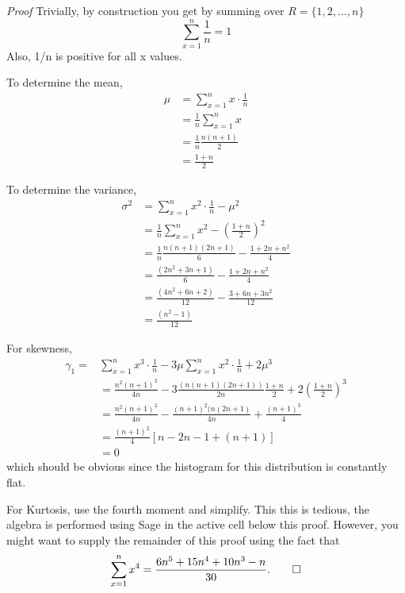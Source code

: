 \documentclass[10pt,]{book}
\makeatletter
\renewcommand*{\proofname}{Proof}
\renewenvironment{proof}[1][\proofname]{\par
  \pushQED{\qed}%
  \normalfont \topsep6\p@\@plus6\p@\relax
  \trivlist
  \item\relax
    {\itshape
    #1\@addpunct{.}}\hspace\labelsep\ignorespaces
}{%
  \popQED\endtrivlist\@endpefalse
}
\numberwithin{equation}{section}
\makeatother
\begin{document}
\begin{proof}\hypertarget{proof-34}{}
\hypertarget{p-795}{}%
Trivially, by construction you get by summing over \(R = \{1, 2, ... , n \}\)%
\begin{equation*}
\sum_{x=1}^n \frac{1}{n} = 1
\end{equation*}
Also, 1/n is positive for all x values.%
\par
\hypertarget{p-796}{}%
To determine the mean,%
\begin{align*}
\mu & = \sum_{x=1}^n x \cdot \frac{1}{n}\\
& = \frac{1}{n}\sum_{x=1}^n x \\
& = \frac{1}{n} \frac{n(n+1)}{2}\\
& = \frac{1+n}{2}
\end{align*}
%
\par
\hypertarget{p-797}{}%
To determine the variance,%
\begin{align*}
\sigma^2 & = \sum_{x=1}^n x^2 \cdot \frac{1}{n} - \mu^2\\
& = \frac{1}{n}\sum_{x=1}^n x^2 - \left ( \frac{1+n}{2}\right )^2 \\
& = \frac{1}{n} \frac{n(n+1)(2n+1)}{6} - \frac{1+2n+n^2}{4}\\
& = \frac{(2n^2+3n+1)}{6} - \frac{1+2n+n^2}{4}\\
& = \frac{(4n^2+6n+2)}{12} - \frac{3+6n+3n^2}{12}\\
& = \frac{(n^2-1)}{12}
\end{align*}
%
\par
\hypertarget{p-798}{}%
For skewness,%
\begin{align*}
\gamma_1 = & \sum_{x=1}^n x^3 \cdot \frac{1}{n} - 3 \mu \sum_{x=1}^n x^2 \cdot \frac{1}{n}  + 2\mu^3\\
& = \frac{n^2(n+1)^2}{4n} - 3\frac{(n(n+1)(2n+1))}{2n} \frac{1+n}{2} + 2 \left ( \frac{1+n}{2}\right )^3 \\
& = \frac{n^2(n+1)^2}{4n} - \frac{(n+1)^2 (n(2n+1)}{4n} + \frac{(n+1)^3}{4}\\
& = \frac{(n+1)^2}{4} \left [ n - 2n -1 + (n+1) \right ]\\
& = 0
\end{align*}
which should be obvious since the histogram for this distribution is constantly flat.%
\par
\hypertarget{p-799}{}%
For Kurtosis, use the fourth moment and simplify.  This this is tedious, the algebra is performed using Sage in the active cell below this proof. However, you might want to supply the remainder of this proof using the fact that%
\begin{equation*}
\sum_{x=1}^n x^4 = \frac{6n^5 + 15n^4 + 10n^3 - n}{30}.\qedhere
\end{equation*}
%
\end{proof}
\end{document}
